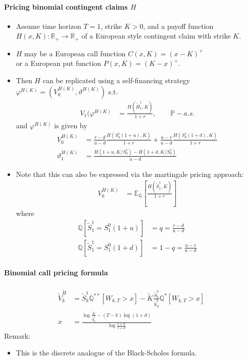 \documentclass[a4paper,landscape,8pt,fleqn]{scrartcl}
\begin{document}
\begin{multicols*}{3}
\paragraph{Pricing binomial contingent claims $H$}

\begin{itemize}
\item Assume time horizon $T=1$, strike $K>0$, and a payoff function $H(x,K): \mathbb{R}_+ \to \mathbb{R}_+$ of a European style contingent claim with strike $K$.
\item $H$ may be a European call function $C(x,K)=(x-K)^+$ \\
or a European put function $P(x,K)=(K-x)^+$.
\item Then $H$ can be replicated using a self-financing strategy $\varphi^{H(K)} = (V_0^{H(K)},\vartheta^{H(K)})$ s.t.
\begin{align*}
V_1(\varphi^{H(K)} &= \frac{H(\tilde H_1^1,K)}{1+r}, \qquad \mathbb{P}-a.s.
\end{align*}
and $\varphi^{H(K)}$ is given by
\begin{align*}
V_0^{H(K)} &= \frac{r-d}{u-d} \frac{H(S_0^1(1+u),K)}{1+r} + \frac{u-r}{u-d} \frac{H(S_0^1(1+d),K)}{1+r} \\
\vartheta_1^{H(K)} &= \frac{H(1+u,K/S_0^1)-H(1+d,K/S_0^1)}{u-d}
\end{align*}
\item Note that this can also be expressed via the martingale pricing approach:
\begin{align*}
V_0^{H(K)} &= \mathbb{E}_\mathbb{Q} \left[ \frac{H(\tilde S_1^1,K)}{1+r} \right]
\end{align*}
where
\begin{align*}
\mathbb{Q}\left[ \tilde S_1^1=S_1^0(1+u) \right] &= q = \frac{r-d}{u-d} \\
\mathbb{Q}\left[ \tilde S_1^1=S_1^0(1+d) \right] &= 1-q = \frac{u-r}{u-d}
\end{align*}
\end{itemize}

\paragraph{Binomial call pricing formula}

\begin{align*}
\tilde V_k^{\tilde H} &= \tilde S_k^1 \mathbb{Q}^{\ast \ast} [W_{k,T} > x] - \tilde K \frac{\tilde S_k^0}{\tilde S_T^0} \mathbb{Q}^\ast [W_{k,T} > x] \\
x &= \frac{\log \frac{\tilde K}{\tilde S_k^1} - (T-k) \log(1+d)}{\log \frac{1+u}{1+d}}
\end{align*}
Remark:
\begin{itemize}
\item This is the discrete analogue of the Black-Scholes formula.
\end{itemize}


\end{multicols*}
\end{document}
